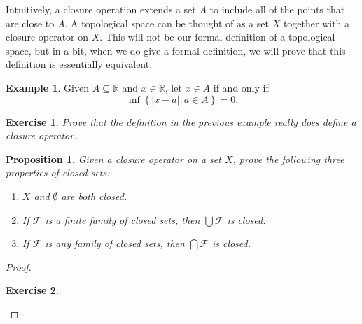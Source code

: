 \documentclass[12pt]{amsart}
\newtheorem{proposition}[theorem]{Proposition}
\newtheorem{exercise}{Exercise}[section]
\theoremstyle{definition}
\newtheorem{example}[theorem]{Example}
\theoremstyle{remark}
\newcommand{\R}{\mathbb{R}}
\newcommand{\explicitSet}[1]{\left\lbrace #1 \right\rbrace}
\newcommand{\set}[2]{\explicitSet{#1 \colon #2}}
\newcommand{\0}{\emptyset}
\newcommand{\closure}[1]{\overline{#1}}
\newcommand{\F}{\mathcal F}
\begin{document}
Intuitively, a closure operation extends a set $A$ to include all of the points that are close to $A$. A topological space can be thought of as a set $X$ together with a closure operator on $X$. This will not be our formal definition of a topological space, but in a bit, when we do give a formal definition, we will prove that this definition is essentially equivalent.

\begin{example}
Given $A \subseteq \R$ and $x \in \R$, let $x \in \closure{A}$ if and only if
$$\inf \set{|x-a|}{a \in A} = 0.$$
\end{example}

\begin{exercise}
Prove that the definition in the previous example really does define a closure operator.
\end{exercise}

\begin{proposition}
Given a closure operator on a set $X$, prove the following three properties of closed sets:
\begin{enumerate}
\item $X$ and $\0$ are both closed.
\item If $\F$ is a finite family of closed sets, then $\bigcup \F$ is closed.
\item If $\F$ is any family of closed sets, then $\bigcap \F$ is closed.
\end{enumerate}
\end{proposition}
\begin{proof}
\begin{exercise}\end{exercise}
\end{proof}
\end{document}
